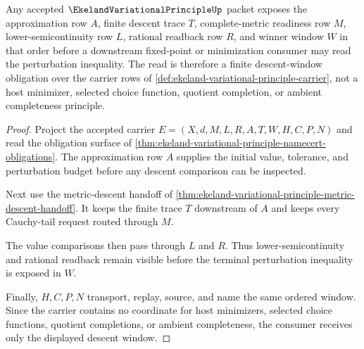 \begin{theorem}
\label{thm:ekeland-variational-principle-descent-window}
Any accepted $\EkelandVariationalPrincipleUp$ packet exposes the approximation row $A$, finite descent trace $T$, complete-metric readiness row $M$, lower-semicontinuity row $L$, rational readback row $R$, and winner window $W$ in that order before a downstream fixed-point or minimization consumer may read the perturbation inequality. The read is therefore a finite descent-window obligation over the carrier rows of \autoref{def:ekeland-variational-principle-carrier}, not a host minimizer, selected choice function, quotient completion, or ambient completeness principle.
\end{theorem}
\begin{proof}
Project the accepted carrier $E=(X,d,M,L,R,A,T,W,H,C,P,N)$ and read the obligation surface of \autoref{thm:ekeland-variational-principle-namecert-obligations}. The approximation row $A$ supplies the initial value, tolerance, and perturbation budget before any descent comparison can be inspected.

Next use the metric-descent handoff of \autoref{thm:ekeland-variational-principle-metric-descent-handoff}. It keeps the finite trace $T$ downstream of $A$ and keeps every Cauchy-tail request routed through $M$.

The value comparisons then pass through $L$ and $R$. Thus lower-semicontinuity and rational readback remain visible before the terminal perturbation inequality is exposed in $W$.

Finally, $H,C,P,N$ transport, replay, source, and name the same ordered window. Since the carrier contains no coordinate for host minimizers, selected choice functions, quotient completions, or ambient completeness, the consumer receives only the displayed descent window.
\end{proof}


